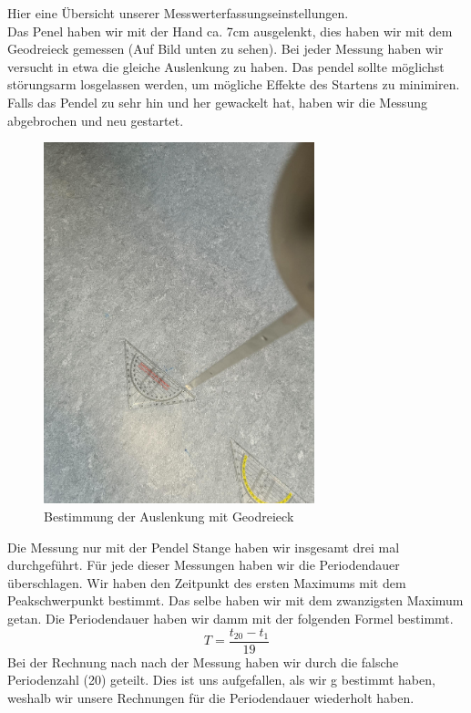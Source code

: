 \documentclass[twoside]{protokoll}
\begin{document}
Hier eine Übersicht unserer Messwerterfassungseinstellungen.\\
Das Penel haben wir mit der Hand ca. 7cm ausgelenkt, dies haben wir mit dem Geodreieck gemessen (Auf Bild unten zu sehen). 
Bei jeder Messung haben wir versucht in etwa die gleiche Auslenkung zu haben. 
Das pendel sollte möglichst störungsarm losgelassen werden, um mögliche Effekte des Startens zu minimiren. 
Falls das Pendel zu sehr hin und her gewackelt hat, haben wir die Messung abgebrochen und neu gestartet.\\
\begin{figure}[H]
    \centering
    \includegraphics[width=0.7\textwidth]{Bilder/geodreieck.pdf}
    \caption{Bestimmung der Auslenkung mit Geodreieck}
    \end{figure}
Die Messung nur mit der Pendel Stange haben wir insgesamt drei mal durchgeführt. 
Für jede dieser Messungen haben wir die Periodendauer überschlagen.
Wir haben den Zeitpunkt des ersten Maximums mit dem Peakschwerpunkt bestimmt. Das selbe haben wir mit dem zwanzigsten Maximum getan. 
Die Periodendauer haben wir damm mit der folgenden Formel bestimmt.
\begin{equation}
T = \frac{t_{20} - t_{1}}{19}
\end{equation}
Bei der Rechnung nach nach der Messung haben wir durch die falsche Periodenzahl (20) geteilt. 
Dies ist uns aufgefallen, als wir g bestimmt haben, weshalb wir unsere Rechnungen für die Periodendauer wiederholt haben.\\
\end{document}
